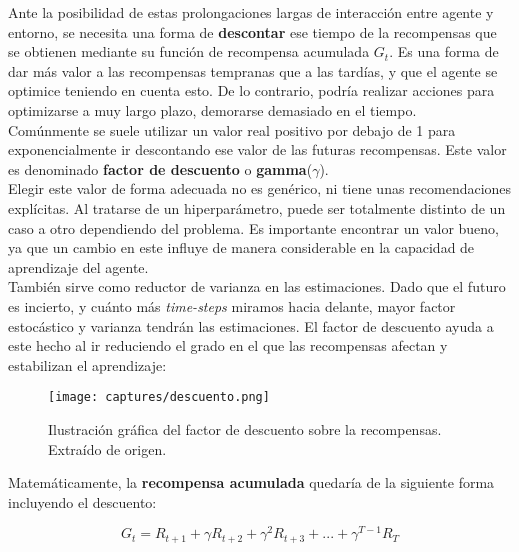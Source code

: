 \documentclass[11pt,fleqn]{book} %
\begin{document}
Ante la posibilidad de estas prolongaciones largas de interacción entre agente y entorno, se necesita una forma de \textbf{descontar} ese tiempo de la recompensas que se obtienen mediante su función de recompensa acumulada $G_t$. Es una forma de dar más valor a las recompensas tempranas que a las tardías, y que el agente se optimice teniendo en cuenta esto. De lo contrario, podría realizar acciones para optimizarse a muy largo plazo, demorarse demasiado en el tiempo. \\

Comúnmente se suele utilizar un valor real positivo por debajo de 1 para exponencialmente ir descontando ese valor de las futuras recompensas. Este valor es denominado \textbf{factor de descuento} o \textbf{gamma}($\gamma$). \\

Elegir este valor de forma adecuada no es genérico, ni tiene unas recomendaciones explícitas. Al tratarse de un hiperparámetro, puede ser totalmente distinto de un caso a otro dependiendo del problema. Es importante encontrar un valor bueno, ya que un cambio en este influye de manera considerable en la capacidad de aprendizaje del agente.\\

También sirve como reductor de varianza en las estimaciones. Dado que el futuro es incierto, y cuánto más \textit{time-steps} miramos hacia delante, mayor factor estocástico y varianza tendrán las estimaciones. El factor de descuento ayuda a este hecho al ir reduciendo el grado en el que las recompensas afectan y estabilizan el aprendizaje: \\

\begin{figure}[H]
	\centering\texttt{[image: captures/descuento.png]}
	\caption{Ilustración gráfica del factor de descuento sobre la recompensas. Extraído de origen. \cite{book:miguel}}
	\label{fig:descuento} %
\end{figure}

Matemáticamente, la \textbf{recompensa acumulada} quedaría de la siguiente forma incluyendo el descuento:

\begin{equation*}
G_t=R_{t+1}+\gamma R_{t+2}+ \gamma^2R_{t+3}+...+\gamma^{T-1}R_T
\end{equation*}
\end{document}
